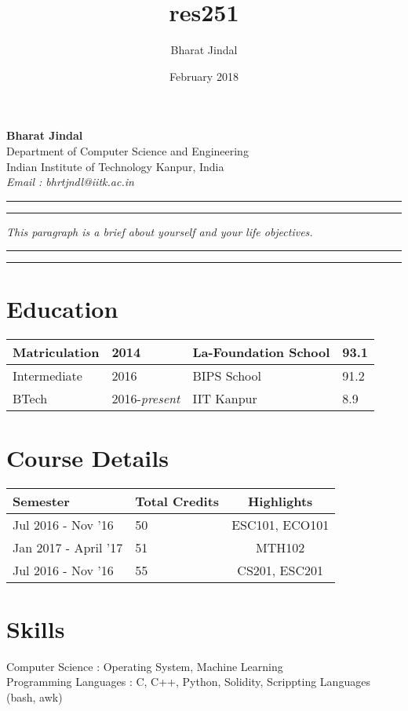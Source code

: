 \documentclass{article}
\title{res251}
\author{Bharat Jindal}
\date{February 2018}
\begin{document}
\noindent
\textbf{\large Bharat Jindal}\\
Department of Computer Science and Engineering\\
Indian Institute of Technology Kanpur, India\\
\textit{Email : bhrtjndl@iitk.ac.in}

\vspace{0.5cm}

\hrule
\vspace{0.1cm}
\hrule
\vspace{0.2cm}
\noindent
\textit{This paragraph is a brief about yourself and your life objectives.}
\lipsum[4]

\vspace{0.2cm}
\hrule
\vspace{0.1cm}
\hrule

\section*{\fontsize{11}{15}\selectfont Education}

\begin{tabular}{|l|l|l|l|}
\hline
Matriculation & 2014 & La-Foundation School & 93.1 \\
\hline
Intermediate & 2016 & BIPS School & 91.2 \\
\hline
BTech & 2016-\textit{present} & IIT Kanpur & 8.9 \\
\hline
\end{tabular}

\section*{\fontsize{11}{15}\selectfont Course Details}

\begin{tabular}{|l|l|c|}
\hline
{\bf Semester} & {\bf Total Credits} & {\bf Highlights} \\
 \hline
Jul 2016 - Nov '16 & 50 & ESC101, ECO101 \\
 \hline
Jan 2017 - April '17 & 51 & MTH102 \\
\hline
Jul 2016 - Nov '16 & 55 & CS201, ESC201 \\
\hline
\end{tabular}


\section*{\fontsize{11}{15}\selectfont Skills}
Computer Science \hspace{1.5cm}: \hspace{1cm} Operating System, Machine Learning\\
Programming Languages \hspace{0.45cm}: \hspace{1cm} C, C++, Python, Solidity, Scrippting Languages (bash, awk)
\end{document}
